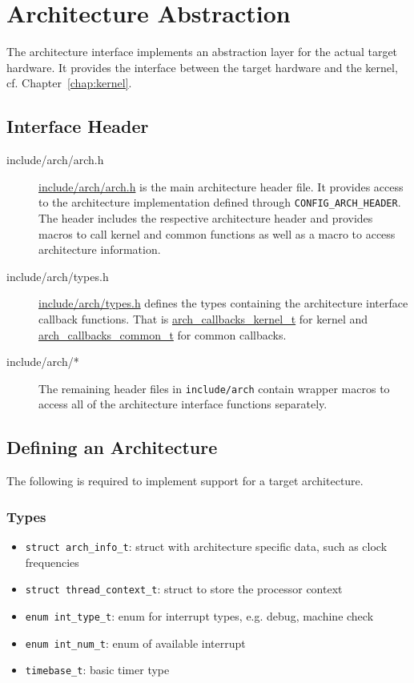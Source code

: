 \chapter{Architecture Abstraction\label{chap:arch}}
	The architecture interface implements an abstraction layer for the actual target hardware. It provides the interface between the target hardware and the kernel, cf. Chapter~\ref{chap:kernel}.


\section{Interface Header}
	\begin{description}
	\item[include/arch/arch.h]
		\hyperref[arch_2arch_8h]{include/arch/arch.h} is the main architecture header file. It provides access to the architecture implementation defined through \lstinline{CONFIG_ARCH_HEADER}. The header includes the respective architecture header and provides macros to call kernel and common functions as well as a macro to access architecture information.	
		

	\item[include/arch/types.h]
		\hyperref[arch_2types_8h]{include/arch/types.h} defines the types containing the architecture interface callback functions. That is \hyperref[structarch__callbacks__kernel__t]{arch\_callbacks\_kernel\_t} for kernel and \hyperref[structarch__callbacks__common__t]{arch\_callbacks\_common\_t} for common callbacks.

	\item[include/arch/*]
		The remaining header files in \lstinline{include/arch} contain wrapper macros to access all of the architecture interface functions separately.
	\end{description}


\section{Defining an Architecture}
	The following is required to implement support for a target architecture.

	\subsection{Types}
		\begin{itemize}
			\item \lstinline{struct arch_info_t}: struct with architecture specific data, such as clock frequencies
			\item \lstinline{struct thread_context_t}: struct to store the processor context
			\item \lstinline{enum int_type_t}: enum for interrupt types, e.g. debug, machine check
			\item \lstinline{enum int_num_t}: enum of available interrupt
			\item \lstinline{timebase_t}: basic timer type
		\end{itemize}

